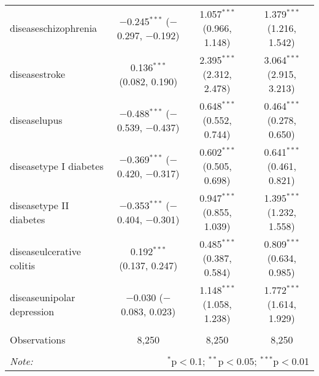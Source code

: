 \begin{table}[!htbp]
\begin{tabular}{@{\extracolsep{5pt}}lccc}
  diseaseschizophrenia & $-$0.245$^{***}$ ($-$0.297, $-$0.192) & 1.057$^{***}$ (0.966, 1.148) & 1.379$^{***}$ (1.216, 1.542) \\ 
  diseasestroke & 0.136$^{***}$ (0.082, 0.190) & 2.395$^{***}$ (2.312, 2.478) & 3.064$^{***}$ (2.915, 3.213) \\ 
  diseaselupus & $-$0.488$^{***}$ ($-$0.539, $-$0.437) & 0.648$^{***}$ (0.552, 0.744) & 0.464$^{***}$ (0.278, 0.650) \\ 
  diseasetype I diabetes & $-$0.369$^{***}$ ($-$0.420, $-$0.317) & 0.602$^{***}$ (0.505, 0.698) & 0.641$^{***}$ (0.461, 0.821) \\ 
  diseasetype II diabetes & $-$0.353$^{***}$ ($-$0.404, $-$0.301) & 0.947$^{***}$ (0.855, 1.039) & 1.395$^{***}$ (1.232, 1.558) \\ 
  diseaseulcerative colitis & 0.192$^{***}$ (0.137, 0.247) & 0.485$^{***}$ (0.387, 0.584) & 0.809$^{***}$ (0.634, 0.985) \\ 
  diseaseunipolar depression & $-$0.030 ($-$0.083, 0.023) & 1.148$^{***}$ (1.058, 1.238) & 1.772$^{***}$ (1.614, 1.929) \\ 
 \hline \\[-1.8ex] 
Observations & 8,250 & 8,250 & 8,250 \\ 
\hline 
\hline \\[-1.8ex] 
\textit{Note:}  & \multicolumn{3}{r}{$^{*}$p$<$0.1; $^{**}$p$<$0.05; $^{***}$p$<$0.01} \\ 
\end{tabular} 
\end{table} 
